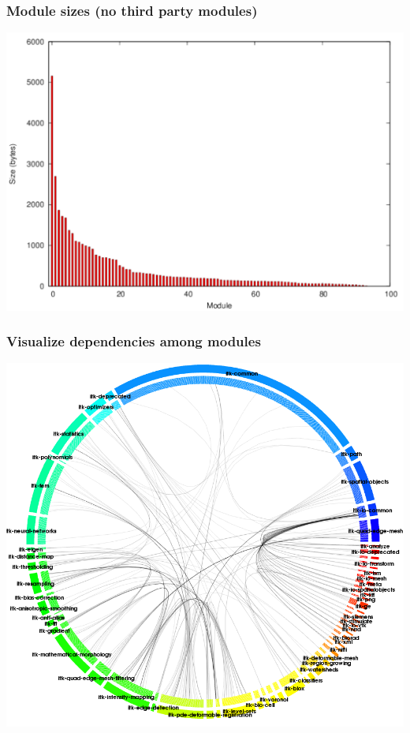 \begin{frame}
\frametitle{Module sizes (no third party modules)}
\center
\begin{center}
\includegraphics[height=0.8\textheight]{../Art/moduleSizePlotNoThirdParty.pdf}
\end{center}
\end{frame}

\begin{frame}
\frametitle{Visualize dependencies among modules}
\center
\begin{center}
\includegraphics[height=0.8\textheight]{../Art/moduleDependency.png}
\end{center}
\end{frame}

